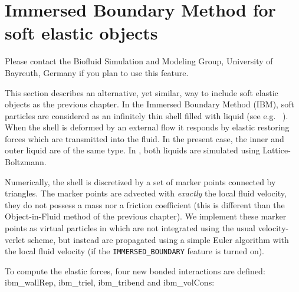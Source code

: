 %  
%   
%  
%  
%

\chapter{Immersed Boundary Method for soft elastic objects}
\label{sec:ibm}

\begin{citebox}
  Please contact the Biofluid Simulation and Modeling Group, University of Bayreuth, Germany if you plan to use this feature. 
\end{citebox}

This section describes an alternative, yet similar, way to include soft elastic objects as the previous chapter. In the Immersed Boundary Method (IBM), soft particles are considered as an infinitely thin shell filled with liquid (see e.g. ~\cite{KruegerThesis, Crowl2011}). When the shell is deformed by an external flow it responds by elastic restoring forces which are transmitted into the fluid. In the present case, the inner and outer liquid are of the same type. In \es, both liquids are simulated using Lattice-Boltzmann. 

Numerically, the shell is discretized by a set of marker points connected by triangles. The marker points are advected with \emph{exactly} the local fluid velocity, they do not possess a mass nor a friction coefficient (this is different than the Object-in-Fluid method of the previous chapter). We implement these marker points as virtual particles in \es which are not integrated using the usual velocity-verlet scheme, but instead are propagated using a simple Euler algorithm with the local fluid velocity (if the \texttt{IMMERSED_BOUNDARY} feature is turned on).

To compute the elastic forces, four new bonded interactions are defined: ibm\_wallRep, ibm\_triel, ibm\_tribend and ibm\_volCons:

